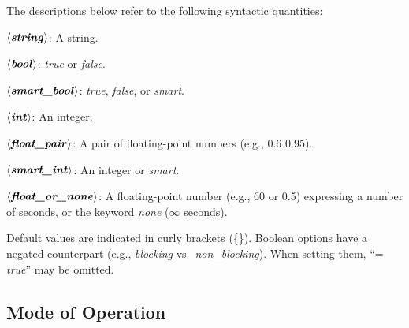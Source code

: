\documentclass[a4paper,12pt]{article}
\def\qtybf#1{$\mathbf{\left<\textbf{\textit{#1\/}}\right>}$}
\begin{document}
The descriptions below refer to the following syntactic quantities:

\begin{enum}
\item[\labelitemi] \qtybf{string}: A string.
\item[\labelitemi] \qtybf{bool\/}: \textit{true} or \textit{false}.
\item[\labelitemi] \qtybf{smart\_bool\/}: \textit{true}, \textit{false}, or
\textit{smart}.
\item[\labelitemi] \qtybf{int\/}: An integer.
\item[\labelitemi] \qtybf{float\_pair\/}: A pair of floating-point numbers
(e.g., 0.6 0.95).
\item[\labelitemi] \qtybf{smart\_int\/}: An integer or \textit{smart}.
\item[\labelitemi] \qtybf{float\_or\_none\/}: A floating-point number (e.g., 60 or
0.5) expressing a number of seconds, or the keyword \textit{none} ($\infty$
seconds).
\end{enum}

Default values are indicated in curly brackets (\textrm{\{\}}). Boolean options
have a negated counterpart (e.g., \textit{blocking} vs.\
\textit{non\_blocking}). When setting them, ``= \textit{true\/}'' may be omitted.

\subsection{Mode of Operation}
\label{mode-of-operation}
\end{document}
